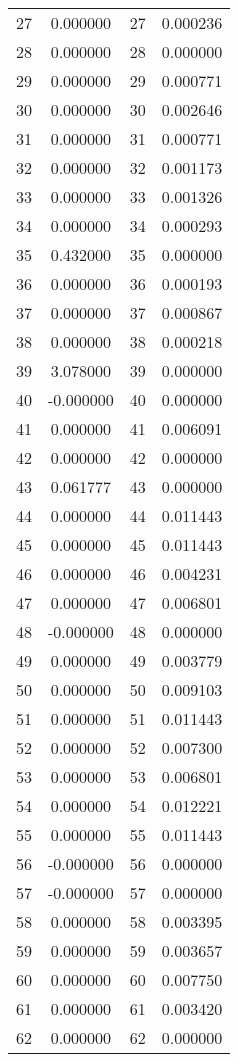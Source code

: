 \documentclass[12pt]{article}
\begin{document}
\begin{longtable}{@{}cccc@{}}
27 & 0.000000 & 27 & 0.000236 \\
28 & 0.000000 & 28 & 0.000000 \\
29 & 0.000000 & 29 & 0.000771 \\
30 & 0.000000 & 30 & 0.002646 \\
31 & 0.000000 & 31 & 0.000771 \\
32 & 0.000000 & 32 & 0.001173 \\
33 & 0.000000 & 33 & 0.001326 \\
34 & 0.000000 & 34 & 0.000293 \\
35 & 0.432000 & 35 & 0.000000 \\
36 & 0.000000 & 36 & 0.000193 \\
37 & 0.000000 & 37 & 0.000867 \\
38 & 0.000000 & 38 & 0.000218 \\
39 & 3.078000 & 39 & 0.000000 \\
40 & -0.000000 & 40 & 0.000000 \\
41 & 0.000000 & 41 & 0.006091 \\
42 & 0.000000 & 42 & 0.000000 \\
43 & 0.061777 & 43 & 0.000000 \\
44 & 0.000000 & 44 & 0.011443 \\
45 & 0.000000 & 45 & 0.011443 \\
46 & 0.000000 & 46 & 0.004231 \\
47 & 0.000000 & 47 & 0.006801 \\
48 & -0.000000 & 48 & 0.000000 \\
49 & 0.000000 & 49 & 0.003779 \\
50 & 0.000000 & 50 & 0.009103 \\
51 & 0.000000 & 51 & 0.011443 \\
52 & 0.000000 & 52 & 0.007300 \\
53 & 0.000000 & 53 & 0.006801 \\
54 & 0.000000 & 54 & 0.012221 \\
55 & 0.000000 & 55 & 0.011443 \\
56 & -0.000000 & 56 & 0.000000 \\
57 & -0.000000 & 57 & 0.000000 \\
58 & 0.000000 & 58 & 0.003395 \\
59 & 0.000000 & 59 & 0.003657 \\
60 & 0.000000 & 60 & 0.007750 \\
61 & 0.000000 & 61 & 0.003420 \\
62 & 0.000000 & 62 & 0.000000 \\

\end{longtable}
\end{document}
